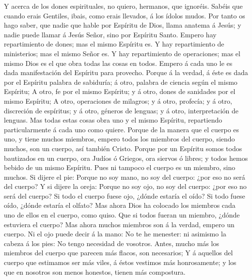  Y acerca de los dones espirituales, no quiero, hermanos,
que ignoréis.  Sabéis que cuando erais Gentiles, ibais,
como erais llevados, á los ídolos mudos.  Por tanto os
hago saber, que nadie que hable por Espíritu de Dios, llama anatema á
Jesús; y nadie puede llamar á Jesús Señor, sino por Espíritu Santo.
 Empero hay repartimiento de dones; mas el mismo Espíritu
es.  Y hay repartimiento de ministerios; mas el mismo
Señor es.  Y hay repartimiento de operaciones; mas el
mismo Dios es el que obra todas las cosas en todos. 
Empero á cada uno le es dada manifestación del Espíritu para provecho.
 Porque á la verdad, á éste es dada por el Espíritu
palabra de sabiduría; á otro, palabra de ciencia según el mismo
Espíritu;  A otro, fe por el mismo Espíritu; y á otro,
dones de sanidades por el mismo Espíritu;  A otro,
operaciones de milagros; y á otro, profecía; y á otro, discreción de
espíritus; y á otro, géneros de lenguas; y á otro, interpretación de
lenguas.  Mas todas estas cosas obra uno y el mismo
Espíritu, repartiendo particularmente á cada uno como quiere.
 Porque de la manera que el cuerpo es uno, y tiene muchos
miembros, empero todos los miembros del cuerpo, siendo muchos, son un
cuerpo, así también Cristo.  Porque por un Espíritu somos
todos bautizados en un cuerpo, ora Judíos ó Griegos, ora siervos ó
libres; y todos hemos bebido de un mismo Espíritu.  Pues
ni tampoco el cuerpo es un miembro, sino muchos.  Si
dijere el pie: Porque no soy mano, no soy del cuerpo: ¿por eso no será
del cuerpo?  Y si dijere la oreja: Porque no soy ojo, no
soy del cuerpo: ¿por eso no será del cuerpo?  Si todo el
cuerpo fuese ojo, ¿dónde estaría el oído? Si todo fuese oído, ¿dónde
estaría el olfato?  Mas ahora Dios ha colocado los
miembros cada uno de ellos en el cuerpo, como quiso.  Que
si todos fueran un miembro, ¿dónde estuviera el cuerpo? 
Mas ahora muchos miembros son á la verdad, empero un cuerpo.
 Ni el ojo puede decir á la mano: No te he menester: ni
asimismo la cabeza á los pies: No tengo necesidad de vosotros.
 Antes, mucho más los miembros del cuerpo que parecen más
flacos, son necesarios;  Y á aquellos del cuerpo que
estimamos ser más viles, á éstos vestimos más honrosamente; y los que en
nosotros son menos honestos, tienen más compostura. 
